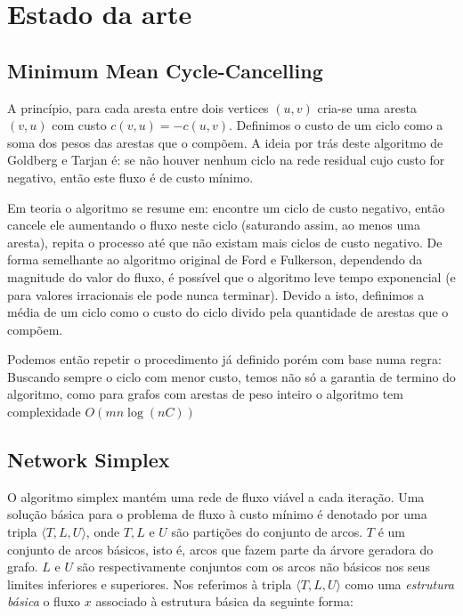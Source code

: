 \documentclass[12pt, a4]{article}
\begin{document}
\section{Estado da arte}
\label{sec:state-of-the-art}

\subsection{Minimum Mean Cycle-Cancelling}
\label{subsec:min-mean-cycle-cancelling}

A princípio, para cada aresta entre dois vertices $(u,v)$ cria-se uma aresta
$(v,u)$ com custo $c(v,u) = -c(u,v)$. Definimos o custo de um ciclo como a soma
dos pesos das arestas que o compõem. A ideia por trás deste algoritmo de
Goldberg e Tarjan é: se não houver nenhum ciclo na rede residual cujo custo for
negativo, então este fluxo é de custo mínimo.

Em teoria o algoritmo se resume em: encontre um ciclo de custo negativo, então
cancele ele aumentando o fluxo neste ciclo (saturando assim, ao menos uma
aresta), repita o processo até que não existam mais ciclos de custo negativo. De
forma semelhante ao algoritmo original de Ford e Fulkerson, dependendo da
magnitude do valor do fluxo, é possível que o algoritmo leve tempo exponencial
(e para valores irracionais ele pode nunca terminar). Devido a isto, definimos a
média de um ciclo como o custo do ciclo divido pela quantidade de arestas que o
compõem.

Podemos então repetir o procedimento já definido porém com base numa regra:
Buscando sempre o ciclo com menor custo, temos não só a garantia de termino do
algoritmo, como para grafos com arestas de peso inteiro o algoritmo tem
complexidade $O(mn \log(nC))$

\subsection{Network Simplex}
\label{subsec:network-simplex}

O algoritmo simplex mantém uma rede de fluxo viável a cada iteração. Uma solução
básica para o problema de fluxo à custo mínimo é denotado por uma tripla
$\langle T,L,U \rangle$, onde $T,L$ e $U$ são partições do conjunto de arcos.
$T$ é um conjunto de arcos básicos, isto é, arcos que fazem parte da árvore
geradora do grafo. $L$ e $U$ são respectivamente conjuntos com os arcos não
básicos nos seus limites inferiores e superiores. Nos referimos à tripla
$\langle T,L,U \rangle$ como uma \textit{estrutura básica} o fluxo $x$ associado
à estrutura básica da seguinte forma:
\end{document}
